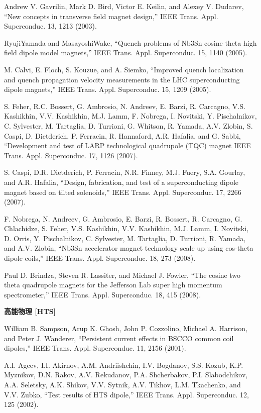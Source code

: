 \noindent [9.330] Andrew V. Gavrilin, Mark D. Bird, Victor E. Keilin, and Alexey V. Dudarev, ``New
concepts in transverse field magnet design,” IEEE Trans. Appl. Superconduc. 13,
1213 (2003).

\noindent [9.331] RyujiYamada and MasayoshiWake, ``Quench problems of Nb3Sn cosine theta high
field dipole model magnets,” IEEE Trans. Appl. Superconduc. 15, 1140 (2005).

\noindent [9.332] M. Calvi, E. Floch, S. Kouzue, and A. Siemko, ``Improved quench localization and
quench propagation velocity measurements in the LHC superconducting dipole
magnets,” IEEE Trans. Appl. Superconduc. 15, 1209 (2005).

\noindent [9.333] S. Feher, R.C. Bossert, G. Ambrosio, N. Andreev, E. Barzi, R. Carcagno, V.S.
Kashikhin, V.V. Kashikhin, M.J. Lamm, F. Nobrega, I. Novitski, Y. Pischalnikov,
C. Sylvester, M. Tartaglia, D. Turrioni, G. Whitson, R. Yamada, A.V. Zlobin,
S. Caspi, D. Dietderich, P. Ferracin, R. Hannaford, A.R. Hafalia, and G. Sabbi,
``Development and test of LARP technological quadrupole (TQC) magnet IEEE
Trans. Appl. Superconduc. 17, 1126 (2007).

\noindent [9.334] S. Caspi, D.R. Dietderich, P. Ferracin, N.R. Finney, M.J. Fuery, S.A. Gourlay, and
A.R. Hafalia, ``Design, fabrication, and test of a superconducting dipole magnet based on tilted solenoids,” IEEE Trans. Appl. Superconduc. 17, 2266 (2007).

\noindent [9.335] F. Nobrega, N. Andreev, G. Ambrosio, E. Barzi, R. Bossert, R. Carcagno, G.
Chlachidze, S. Feher, V.S. Kashikhin, V.V. Kashikhin, M.J. Lamm, I. Novitski,
D. Orris, Y. Pischalnikov, C. Sylvester, M. Tartaglia, D. Turrioni, R. Yamada,
and A.V. Zlobin, ``Nb3Sn accelerator magnet technology scale up using cos-theta
dipole coils,” IEEE Trans. Appl. Superconduc. 18, 273 (2008).

\noindent [9.336] Paul D. Brindza, Steven R. Lassiter, and Michael J. Fowler, ``The cosine two theta
quadrupole magnets for the Jefferson Lab super high momentum spectrometer,”
IEEE Trans. Appl. Superconduc. 18, 415 (2008).

\noindent \textbf{高能物理 [HTS]}

\noindent [9.337] William B. Sampson, Arup K. Ghosh, John P. Cozzolino, Michael A. Harrison,
and Peter J. Wanderer, ``Persistent current effects in BSCCO common coil
dipoles,” IEEE Trans. Appl. Superconduc. 11, 2156 (2001).

\noindent [9.338] A.I. Ageev, I.I. Akirnov, A.M. Andriishchin, I.V. Bogdanov, S.S. Kozub, K.P.
Myznikov, D.N. Rakov, A.V. Rekudanov, P.A. Shcherbakov, P.I. Slabodchikov,
A.A. Seletsky, A.K. Shikov, V.V. Sytnik, A.V. Tikhov, L.M. Tkachenko, and
V.V. Zubko, ``Test results of HTS dipole,” IEEE Trans. Appl. Superconduc. 12,
125 (2002).

